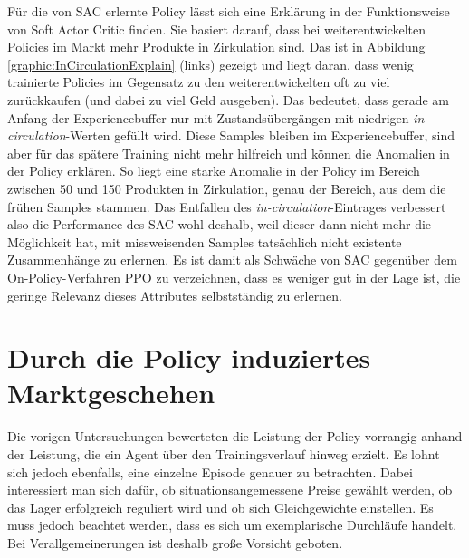 Für die von SAC erlernte Policy lässt sich eine Erklärung in der Funktionsweise von Soft Actor Critic finden.
Sie basiert darauf, dass bei weiterentwickelten Policies im Markt mehr Produkte in Zirkulation sind.
Das ist in Abbildung \ref{graphic:InCirculationExplain} (links) gezeigt und liegt daran, dass wenig trainierte Policies im Gegensatz zu den weiterentwickelten oft zu viel zurückkaufen (und dabei zu viel Geld ausgeben).
Das bedeutet, dass gerade am Anfang der Experiencebuffer nur mit Zustandsübergängen mit niedrigen \textit{in-circulation}-Werten gefüllt wird.
Diese Samples bleiben im Experiencebuffer, sind aber für das spätere Training nicht mehr hilfreich und können die Anomalien in der Policy erklären.
So liegt eine starke Anomalie in der Policy im Bereich zwischen 50 und 150 Produkten in Zirkulation, genau der Bereich, aus dem die frühen Samples stammen.
Das Entfallen des \textit{in-circulation}-Eintrages verbessert also die Performance des SAC wohl deshalb, weil dieser dann nicht mehr die Möglichkeit hat, mit missweisenden Samples tatsächlich nicht existente Zusammenhänge zu erlernen.
Es ist damit als Schwäche von SAC gegenüber dem On-Policy-Verfahren PPO zu verzeichnen, dass es weniger gut in der Lage ist, die geringe Relevanz dieses Attributes selbstständig zu erlernen.

\section{Durch die Policy induziertes Marktgeschehen}
Die vorigen Untersuchungen bewerteten die Leistung der Policy vorrangig anhand der Leistung, die ein Agent über den Trainingsverlauf hinweg erzielt.
Es lohnt sich jedoch ebenfalls, eine einzelne Episode genauer zu betrachten.
Dabei interessiert man sich dafür, ob situationsangemessene Preise gewählt werden, ob das Lager erfolgreich reguliert wird und ob sich Gleichgewichte einstellen.
Es muss jedoch beachtet werden, dass es sich um exemplarische Durchläufe handelt.
Bei Verallgemeinerungen ist deshalb große Vorsicht geboten.

